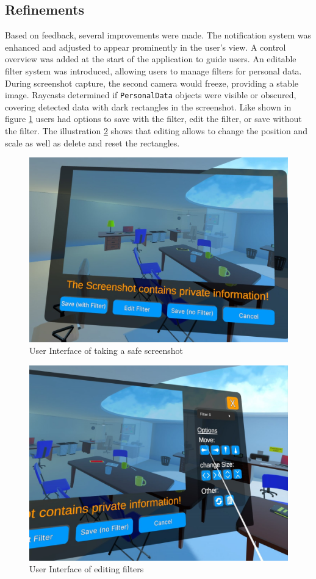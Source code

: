 \documentclass[sigconf,authordraft]{acmart}
\begin{document}
\subsection{Refinements}
Based on feedback, several improvements were made. The notification system was enhanced and adjusted to appear prominently in the user's view. A control overview was added at the start of the application to guide users. An editable filter system was introduced, allowing users to manage filters for personal data. During screenshot capture, the second camera would freeze, providing a stable image. Raycasts determined if \texttt{PersonalData} objects were visible or obscured, covering detected data with dark rectangles in the screenshot. Like shown in figure \ref{fig:make_screenshot} users had options to save with the filter, edit the filter, or save without the filter. The illustration \ref{fig:edit_filters} shows that editing allows to change the position and scale as well as delete and reset the rectangles.
\begin{figure}[h]
  \centering
  \includegraphics[width=0.85\linewidth]{How to make a save Screenshot wide.jpg}
  \caption{User Interface of taking a safe screenshot}
  \label{fig:make_screenshot}
\end{figure}

\begin{figure}[h]
  \centering
  \includegraphics[width=0.85\linewidth]{Edit Filter wide.jpg}
  \caption{User Interface of editing filters}
  \label{fig:edit_filters}
\end{figure}
\end{document}

